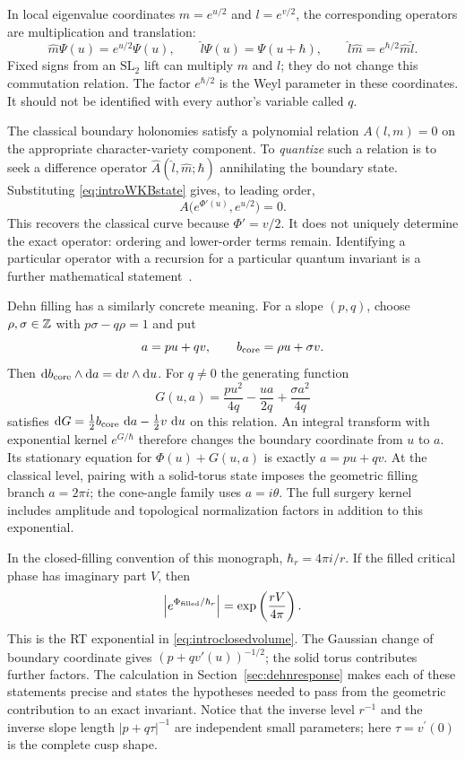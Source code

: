 In local eigenvalue coordinates $m=e^{u/2}$ and $l=e^{v/2}$,
the corresponding operators are multiplication and translation:
\[
 \widehat m\Psi(u)=e^{u/2}\Psi(u),\qquad
 \widehat l\Psi(u)=\Psi(u+\hbar),\qquad
 \widehat l\widehat m=e^{\hbar/2}\widehat m\widehat l.
\]
Fixed signs from an $\mathrm{SL}_2$ lift can multiply $m$ and $l$;
they do not change this commutation relation. The factor
$e^{\hbar/2}$ is the Weyl parameter in these coordinates. It should
not be identified with every author's variable called $q$.

The classical boundary holonomies satisfy a polynomial relation
$A(l,m)=0$ on the appropriate character-variety component. To
\emph{quantize} such a relation is to seek a difference operator
$\widehat A(\widehat l,\widehat m;\hbar)$ annihilating the boundary
state. Substituting \eqref{eq:introWKBstate} gives, to leading order,
\[
 A\bigl(e^{\Phi'(u)},e^{u/2}\bigr)=0.
\]
This recovers the classical curve because $\Phi'=v/2$. It does not
uniquely determine the exact operator: ordering and lower-order
terms remain. Identifying a particular operator with a recursion
for a particular quantum invariant is a further mathematical
statement~\cite{GukovApoly,DimofteQuantumRS}.

Dehn filling has a similarly concrete meaning. For a slope $(p,q)$,
choose $\rho,\sigma\in\mathbb Z$ with $p\sigma-q\rho=1$ and put
\[
 a=pu+qv,\qquad b_{\rm core}=\rho u+\sigma v.
\]
Then $\mathop{}\!\mathrm d b_{\rm core}\wedge\mathop{}\!\mathrm d a=\mathop{}\!\mathrm d v\wedge\mathop{}\!\mathrm d u$. For $q\ne0$
the generating function
\begin{equation}
 G(u,a)=\frac{pu^2}{4q}-\frac{ua}{2q}
                    +\frac{\sigma a^2}{4q}
 \label{eq:introfillingkernel}
\end{equation}
satisfies $\mathop{}\!\mathrm d G=\frac12b_{\rm core}\,\mathop{}\!\mathrm d a-\frac12v\,\mathop{}\!\mathrm d u$ on
this relation. An integral transform with exponential kernel
$e^{G/\hbar}$ therefore changes the boundary coordinate from $u$
to $a$. Its stationary equation for $\Phi(u)+G(u,a)$ is exactly
$a=pu+qv$. At the classical level, pairing with a solid-torus state imposes
the geometric filling branch $a=2\pi i$; the cone-angle family
uses $a=i\theta$.
The full surgery kernel includes amplitude and topological
normalization factors in addition to this exponential.

In the closed-filling convention of this monograph,
$\hbar_r=4\pi i/r$. If the filled critical phase has imaginary
part $V$, then
\begin{equation}
 \left|e^{\Phi_{\rm filled}/\hbar_r}\right|
       =\exp\left(\frac{rV}{4\pi}\right).
 \label{eq:introRTgrowth}
\end{equation}
This is the RT exponential in \eqref{eq:introclosedvolume}.
The Gaussian change of boundary coordinate gives
$(p+qv'(u))^{-1/2}$; the solid torus contributes further factors.
The calculation in Section~\ref{sec:dehnresponse} makes each of
these statements precise and states the hypotheses needed to pass
from the geometric contribution to an exact invariant. Notice that
the inverse level $r^{-1}$ and the inverse slope length
$|p+q\tau|^{-1}$ are independent small parameters; here
$\tau=v^\prime(0)$ is the complete cusp shape.

